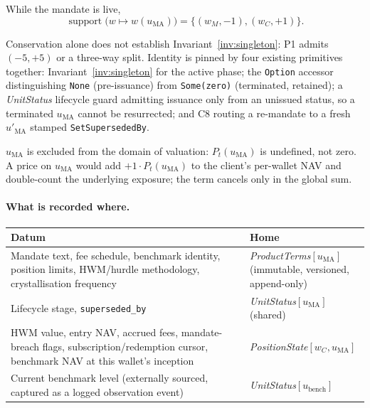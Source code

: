 \begin{invariant}
\label{inv:singleton}
While the mandate is live,
\[
\operatorname{support}\big(w\mapsto w(u_{\mathrm{MA}})\big)=\{(w_M,-1),(w_C,+1)\}.
\]
\end{invariant}

Conservation alone does not establish Invariant~\ref{inv:singleton}: P1 admits $(-5,+5)$ or a
three-way split. Identity is pinned by four existing primitives together: Invariant~\ref{inv:singleton}
for the active phase; the \texttt{Option} accessor distinguishing \texttt{None} (pre-issuance)
from \texttt{Some(zero)} (terminated, retained); a \textit{UnitStatus} lifecycle guard admitting
issuance only from an unissued status, so a terminated $u_{\mathrm{MA}}$ cannot be resurrected;
and C8 routing a re-mandate to a fresh $u'_{\mathrm{MA}}$ stamped \texttt{SetSupersededBy}.

\begin{principle}
\label{prin:nonvalued}
$u_{\mathrm{MA}}$ is excluded from the domain of valuation: $P_t(u_{\mathrm{MA}})$ is undefined,
not zero. A price on $u_{\mathrm{MA}}$ would add $+1\cdot P_t(u_{\mathrm{MA}})$ to the client's
per-wallet NAV and double-count the underlying exposure; the term cancels only in the global sum.
\end{principle}

\paragraph{What is recorded where.}

\begin{longtable}{p{8.0cm}p{6.4cm}}
\toprule
\textbf{Datum} & \textbf{Home} \\
\midrule
Mandate text, fee schedule, benchmark identity, position limits, HWM/hurdle methodology,
crystallisation frequency & \textit{ProductTerms}$[u_{\mathrm{MA}}]$ (immutable, versioned,
append-only) \\
Lifecycle stage, \texttt{superseded\_by} & \textit{UnitStatus}$[u_{\mathrm{MA}}]$ (shared) \\
HWM value, entry NAV, accrued fees, mandate-breach flags, subscription/redemption cursor,
benchmark NAV at this wallet's inception & \textit{PositionState}$[w_C,u_{\mathrm{MA}}]$ \\
Current benchmark level (externally sourced, captured as a logged observation event) &
\textit{UnitStatus}$[u_{\mathrm{bench}}]$ \\
\bottomrule
\end{longtable}

